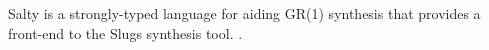 Salty is a strongly-typed language for aiding GR(1) synthesis that provides a front-end to the Slugs synthesis tool. \cite{CCGR00}.

